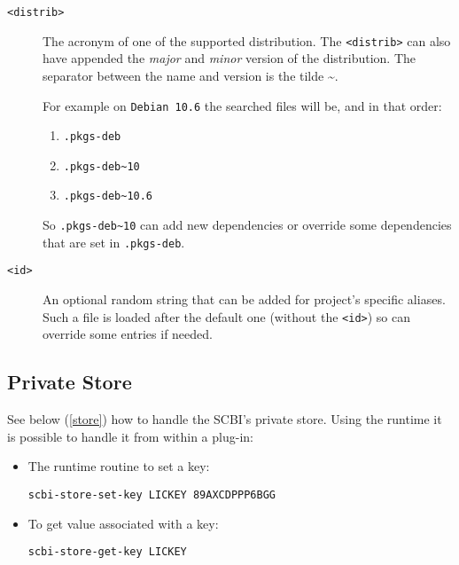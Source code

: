 \documentclass[a4paper,12pt,twoside]{article}
\newcommand{\code}[1]{\texttt{#1}}
\renewcommand{\emph}[1]{\textit{#1}}
\begin{document}
\begin{description}
	\item [\code{<distrib>}] The acronym of one of the supported distribution. The \code{<distrib>} can also have appended the \emph{major} and \emph{minor} version of the distribution. The separator between the name and version is the tilde \textasciitilde{}.

For example on \code{Debian 10.6} the searched files will be, and in that order:

\begin{enumerate}
	\item \code{.pkgs-deb}
	\item \code{.pkgs-deb\textasciitilde{}10}
	\item \code{.pkgs-deb\textasciitilde{}10.6}
\end{enumerate}

So \code{.pkgs-deb\textasciitilde{}10} can add new dependencies or override some dependencies that are set in \code{.pkgs-deb}.

\item [\code{<id>}] An optional random string that can be added for project's specific aliases. Such a file is loaded after the default one (without the \code{<id>}) so can override some entries if needed.
\end{description}

\subsection{Private Store}

See below (\ref{store}) how to handle the SCBI's private store. Using the runtime it is possible to handle it from within a plug-in:

\begin{itemize}
	\item The runtime routine to set a key:

	\hspace{1.5cm}\texttt{scbi-store-set-key LICKEY 89AXCDPPP6BGG}

	\item To get value associated with a key:

	\hspace{1.5cm}\texttt{scbi-store-get-key LICKEY}
\end{itemize}

\end{document}
